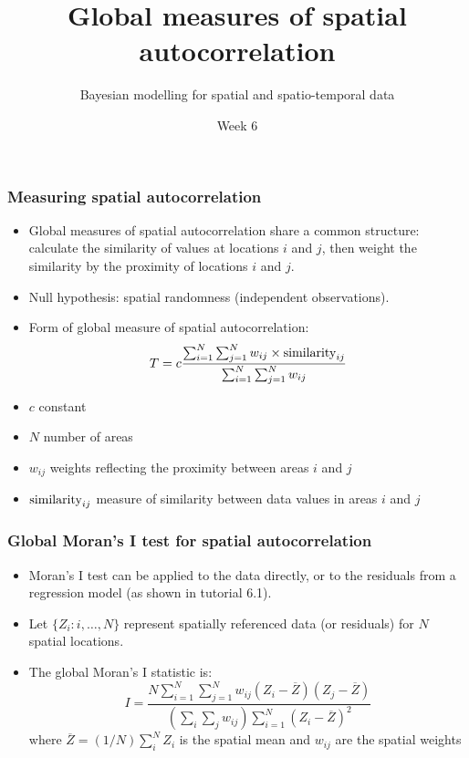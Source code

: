 \documentclass[12pt]{beamer}
\title{Global measures of spatial autocorrelation}
\subtitle{}
\author{Bayesian modelling for spatial and spatio-temporal data}
\institute{MSc in Epidemiology}
\date{Week 6}
\begin{document}
\begin{frame}[t]
  \titlepage
\end{frame}

\begin{frame}
\frametitle{Measuring spatial autocorrelation}
\begin{itemize}\setlength\itemsep{\fill}
\item Global measures of spatial autocorrelation share a common structure: calculate the similarity of values at locations $i$ and $j$, then weight the similarity by the proximity of locations $i$ and $j$.
\item Null hypothesis: spatial randomness (independent observations).
\item Form of global measure of spatial autocorrelation:
$$T= c \frac{\sum_{i=1}^N \sum_{j=1}^N w_{ij} \times \hbox{similarity}_{ij}}{\sum_{i=1}^N \sum_{j=1}^N w_{ij}}$$
\end{itemize}
\footnotesize{
\begin{itemize}\setlength\itemsep{\fill}
\item $c$ constant
\item $N$ number of areas
\item $w_{ij}$ weights reflecting the proximity between areas $i$ and $j$
\item $\hbox{similarity}_{ij}$ measure of similarity between data values in areas $i$ and $j$
\end{itemize}
}
\end{frame}

\begin{frame}
\frametitle{Global Moran's I test for spatial autocorrelation}
\begin{itemize}\setlength\itemsep{\fill}
\item Moran's I test can be applied to the data directly, or to the residuals from a regression model (as shown in tutorial 6.1).
\item Let $\{Z_{i}: i,\dots,N\}$ represent spatially referenced data (or residuals) for $N$ spatial locations.
\item The global Moran's I statistic is:\\
$$ I  = \frac{N \sum_{i=1}^N \sum_{j=1}^N w_{ij}(Z_i - \overline{Z})(Z_j - \overline{Z})}
{\left(\sum_i\sum_j w_{ij}\right)\sum_{i=1}^N (Z_i - \overline{Z})^2} $$
\vspace{5pt}
where $\overline{Z}=(1/N)\sum_i^N Z_i$ is the spatial mean and $w_{ij}$ are the spatial weights
\end{itemize}
\end{frame}
\end{document}
